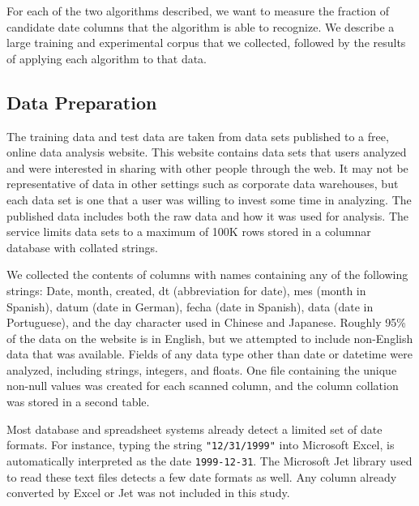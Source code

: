 
For each of the two algorithms described, we want to measure the fraction of candidate date columns that the algorithm is able to recognize. We describe a large training and experimental corpus that we collected, followed by the results of applying each algorithm to that data.
 
\subsection{Data Preparation}

The training data and test data are taken from data sets published to a free, online data analysis website. This website contains data sets that users analyzed and were interested in sharing with other people through the web. It may not be representative of data in other settings such as corporate data warehouses, but each data set is one that a user was willing to invest some time in analyzing. The published data includes both the raw data and how it was used for analysis. The service limits data sets to a maximum of 100K rows stored in a columnar database with collated strings.

We collected the contents of columns with names containing any of the following strings: Date, month, created, dt (abbreviation for date), mes (month in Spanish), datum (date in German), fecha (date in Spanish), data (date in Portuguese), and the day character used in Chinese and Japanese. Roughly 95\% of the data on the website is in English, but we attempted to include non-English data that was available. Fields of any data type other than date or datetime were analyzed, including strings, integers, and floats. One file containing the unique non-null values was created for each scanned column, and the column collation was stored in a second table.

Most database and spreadsheet systems already detect a limited set of date formats. For instance, typing the string \texttt{"12/31/1999"} into Microsoft Excel, is automatically interpreted as the date \texttt{1999-12-31}. The Microsoft Jet library \cite{Jet} used to read these text files detects a few date formats as well. Any column already converted by Excel or Jet was not included in this study.

